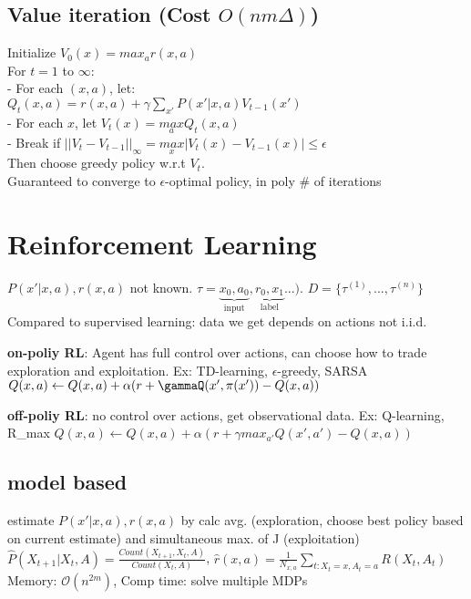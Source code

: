 \subsection{Value iteration (Cost $O(nm\Delta)$)}
Initialize $V_0(x)=max_a r(x,a)$\\
For $t=1$ to $\infty$:\\
- For each $(x,a)$, let: \\
$Q_t(x,a)=r(x,a)+\gamma\sum_{x'}P(x'|x,a)V_{t-1}(x')$\\
- For each $x$, let $V_t(x)=\underset{a}{max}Q_t(x,a)$\\
- Break if $||V_t-V_{t-1}||_{\infty}=\underset{x}{max}|V_t(x)-V_{t-1}(x)|\leq\epsilon$\\
Then choose greedy policy w.r.t $V_t$.\\
Guaranteed to converge to $\epsilon$-optimal policy, in poly \# of iterations

\section{Reinforcement Learning}
$P(x'|x,a), r(x,a)$ not known. $\tau = \underbrace{x_{0}, a_{0}}_{\text{input}},
\underbrace{r_{0}, x_{1}}_{\text{label}}...)$. $D=\{\tau^{(1)}, ..., \tau^{(n )}\}$
Compared to supervised learning: data we get depends on actions \textrightarrow not i.i.d.

\textbf{on-poliy RL}: Agent has full control over actions, can choose how to trade exploration and exploitation.
Ex: TD-learning, $\epsilon$-greedy, SARSA\\
$Q(x,a) \leftarrow Q(x,a) + \alpha(r+\gammaQ(x', \pi(x'))- Q(x,a))$

\textbf{off-poliy RL}: no control over actions, get observational data. Ex: Q-learning, R_max
$Q(x,a) \leftarrow Q(x,a) + \alpha(r+\gamma max_{a'}Q(x', a')- Q(x,a))$

\subsection{model based}
estimate $P(x'|x,a), r(x,a)$ by calc avg. (exploration, choose best policy based on current estimate)
and simultaneous max. of J (exploitation)
$\hat{P}(X_{t+1}|X_{t},A) = \frac{Count(X_{t+1}, X_{t}, A)}{Count(X_t, A)}$,
$\hat{r}(x,a) = \frac{1}{N_{x,a}} \sum_{t:X_{t}=x, A_t=a} R(X_t, A_t)$\\

Memory: $\mathcal{O}(n^{2m})$, Comp time: solve multiple MDPs

